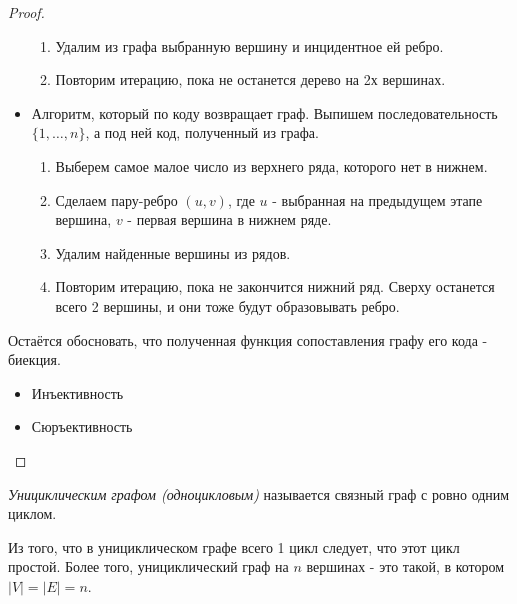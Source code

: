 \begin{multicols}{2}
\begin{proof}
\begin{itemize}
\begin{enumerate}
          \item Удалим из графа выбранную вершину и инцидентное ей ребро.
          
          \item Повторим итерацию, пока не останется дерево на 2х вершинах.
        \end{enumerate}
        
        \item Алгоритм, который по коду возвращает граф.
        Выпишем последовательность $\{1, \ldots, n\}$, а под ней код, полученный из графа.
        \begin{enumerate}
          \item Выберем самое малое число из верхнего ряда, которого нет в нижнем.
          
          \item Сделаем пару-ребро $(u, v)$, где $u$ - выбранная на предыдущем этапе вершина, $v$ - первая вершина в нижнем ряде.
          
          \item Удалим найденные вершины из рядов.
          
          \item Повторим итерацию, пока не закончится нижний ряд. Сверху останется всего 2 вершины, и они тоже будут образовывать ребро.
        \end{enumerate}
      \end{itemize}
    
      Остаётся обосновать, что полученная функция сопоставления графу его кода - биекция.
      \begin{itemize}
        \item Инъективность
        
        \item Сюръективность
      \end{itemize}
    \end{proof}
    
    \begin{definition}{}{}
      \textit{Унициклическим графом (одноцикловым)} называется связный граф с ровно одним циклом.
    \end{definition}
    
    \begin{note}{}{}
      Из того, что в унициклическом графе всего 1 цикл следует, что этот цикл простой. Более того, унициклический граф на $n$ вершинах - это такой, в котором $|V| = |E| = n$.
    \end{note}
    


\end{multicols}

